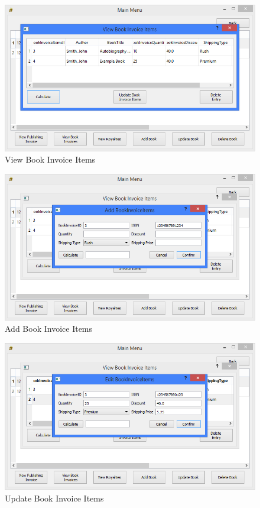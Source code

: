 \begin{figure}[H]
    \caption{View Book Invoice Items} \label{fig:ViewBookInvoiceItems}
    \includegraphics[width=\textwidth]{./Maintenance/UserInterface/ViewBookInvoiceItems.png}
\end{figure}

\begin{figure}[H]
    \caption{Add Book Invoice Items} \label{fig:AddBookInvoiceItems}
    \includegraphics[width=\textwidth]{./Maintenance/UserInterface/AddBookInvoiceItems.png}
\end{figure}

\begin{figure}[H]
    \caption{Update Book Invoice Items} \label{fig:UpdateBookInvoiceItems}
    \includegraphics[width=\textwidth]{./Maintenance/UserInterface/UpdateBookInvoiceItems.png}
\end{figure}

